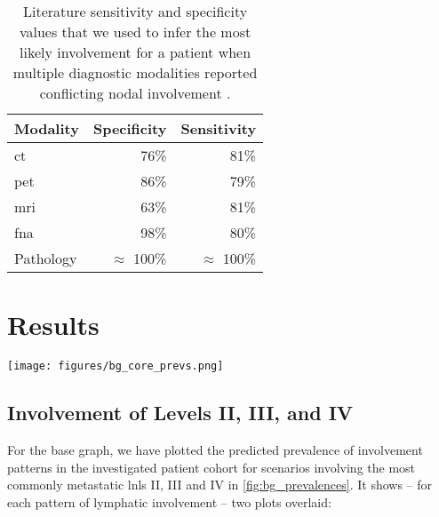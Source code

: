 \documentclass[twocolumn]{aastex631}
\begin{document}
\begin{table}
\centering
    \begin{tabular}{|l|rr|}
        \hline
        \textbf{Modality} & \textbf{Specificity} & \textbf{Sensitivity} \\
        \hline
        \acrshort{ct} & 76\% & 81\% \\
        \acrshort{pet} & 86\% & 79\% \\
        \gls{mri} & 63\% & 81\% \\
        \acrshort{fna} & 98\% & 80\% \\
        Pathology & $\approx$ 100\% & $\approx$ 100\% \\
        \hline
    \end{tabular}
    \caption{Literature sensitivity and specificity values that we used to infer the most likely involvement for a patient when multiple diagnostic modalities reported conflicting nodal involvement \cite{de_bondt_detection_2007,kyzas_18f-fluorodeoxyglucose_2008}.}
    \label{table:sens_spec}
\end{table}



\section{Results}
\label{sec:results}

\begin{figure*}
    \begin{centering}
        \texttt{[image: figures/bg\_core\_prevs.png]}
        \caption{Prevalence of involvement as predicted by the base graph model for different scenarios involving the most commonly metastatic \glspl{lnl} II, III and IV (shaded histograms). The model's predictions are compared to Beta posteriors over the prevalence based on the frequency of the same scenarios and a uniform prior (slid lines). The top panel shows some selected scenarios with early T-category tumors and the bottom panel with late T-category.}
        \label{fig:bg_prevalences}
    \end{centering}
\end{figure*}


\subsection{Involvement of Levels II, III, and IV}
\label{subsec:results:lnls_II_III_IV}

For the base graph, we have plotted the predicted prevalence of involvement patterns in the investigated patient cohort for scenarios involving the most commonly metastatic \glspl{lnl} II, III and IV in \cref{fig:bg_prevalences}. It shows -- for each pattern of lymphatic involvement -- two plots overlaid:
\end{document}
